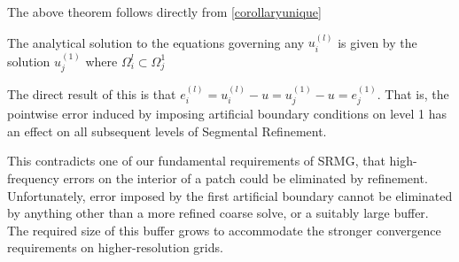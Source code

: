 \documentclass[final]{siamart1116}
\numberwithin{theorem}{section}
\begin{document}
The above theorem follows directly from \ref{corollaryunique}
 



\begin{corollary}
The analytical solution to the equations governing any $u^{(l)}_i$ is given by the solution $u^{(1)}_j$ where $\Omega^{l}_i \subset \Omega^{1}_j$
\end{corollary}

The direct result of this is that $e^{(l)}_i = u^{(l)}_i - u = u^{(1)}_j - u = e^{(1)}_j$. That is, the pointwise error induced by imposing artificial boundary conditions on level 1 has an effect on all subsequent levels of Segmental Refinement. 

This contradicts one of our fundamental requirements of SRMG, that high-frequency errors on the interior of a patch could be eliminated by refinement. Unfortunately, error imposed by the first artificial boundary cannot be eliminated by anything other than a more refined coarse solve, or a suitably large buffer. The required size of this buffer grows to accommodate the stronger convergence requirements on higher-resolution grids. 


\end{document}
